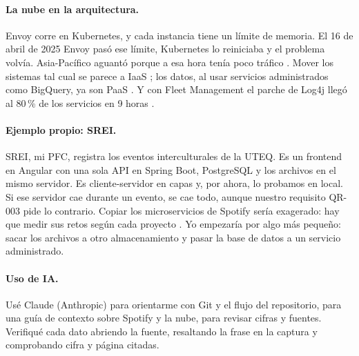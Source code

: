 \paragraph{La nube en la arquitectura.}
Envoy corre en Kubernetes, y cada instancia tiene un límite de memoria.
El 16 de abril de 2025 Envoy pasó ese límite, Kubernetes lo reiniciaba
y el problema volvía. Asia-Pacífico aguantó porque a esa hora tenía
poco tráfico \cite{spotifyIncident2025}. Mover los sistemas tal cual se
parece a IaaS \cite{strid2023fleet}; los datos, al usar servicios
administrados como BigQuery, ya son PaaS
\cite{khlebnikova2024dataplatform}. Y con Fleet Management el parche de
Log4j llegó al 80\,\% de los servicios en 9 horas
\cite{gustavsson2023fleet}.

\paragraph{Ejemplo propio: SREI.}
SREI, mi PFC, registra los eventos interculturales de la UTEQ. Es
un frontend en Angular con una sola API en Spring Boot, PostgreSQL y
los archivos en el mismo servidor. Es cliente-servidor en capas y, por
ahora, lo probamos en local. Si ese servidor cae durante un
evento, se cae todo, aunque nuestro requisito QR-003 pide lo contrario.
Copiar los microservicios de Spotify sería exagerado: hay que medir sus
retos según cada proyecto \cite[p.~1]{soylemez2022microservices}. Yo
empezaría por algo más pequeño: sacar los archivos a otro
almacenamiento y pasar la base de datos a un servicio administrado.

\paragraph{Uso de IA.}
Usé Claude (Anthropic) para orientarme con Git y el flujo del repositorio,
para una guía de contexto sobre Spotify y la nube, para revisar cifras y fuentes.
Verifiqué cada dato abriendo la fuente, resaltando la frase en la captura y
comprobando cifra y página citadas.


